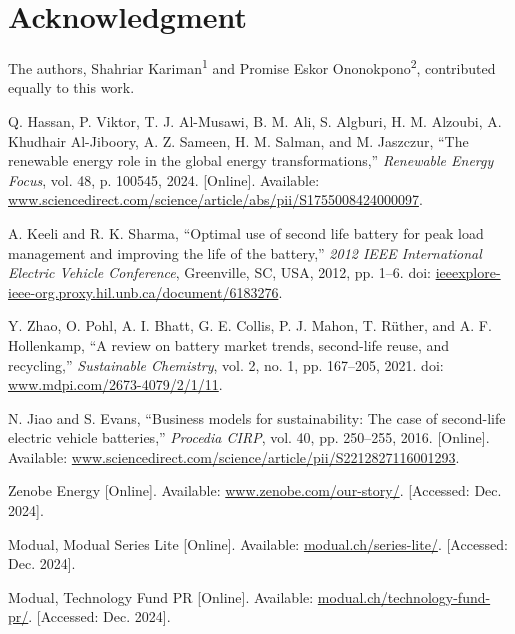 \documentclass[conference]{IEEEtran}
\begin{document}
\section*{Acknowledgment}

The authors, Shahriar Kariman\textsuperscript{1} and Promise Eskor Ononokpono\textsuperscript{2}, contributed equally to this work.

\begin{thebibliography}{00}
 Q. Hassan, P. Viktor, T. J. Al-Musawi, B. M. Ali, S. Algburi, H. M. Alzoubi, A. Khudhair Al-Jiboory, A. Z. Sameen, H. M. Salman, and M. Jaszczur, ``The renewable energy role in the global energy transformations,'' \textit{Renewable Energy Focus}, vol. 48, p. 100545, 2024. [Online]. Available: \href{https://www.sciencedirect.com/science/article/abs/pii/S1755008424000097?casa_token=bUNZr0M6nogAAAAA:BW6rOq1yhF3iUOtobThX-tDWVjZDpJL9Hzmk0HS78usaDj24Zq_MftqZLBkgYpIrtdgdilaX}{www.sciencedirect.com/science/article/abs/pii/S1755008424000097}.

 A. Keeli and R. K. Sharma, ``Optimal use of second life battery for peak load management and improving the life of the battery,''  \textit{2012 IEEE International Electric Vehicle Conference}, Greenville, SC, USA, 2012, pp. 1--6. doi: \href{https://ieeexplore-ieee-org.proxy.hil.unb.ca/document/6183276}{ieeexplore-ieee-org.proxy.hil.unb.ca/document/6183276}.


 Y. Zhao, O. Pohl, A. I. Bhatt, G. E. Collis, P. J. Mahon, T. Rüther, and A. F. Hollenkamp, ``A review on battery market trends, second-life reuse, and recycling,'' \textit{Sustainable Chemistry}, vol. 2, no. 1, pp. 167--205, 2021. doi: \href{https://www.mdpi.com/2673-4079/2/1/11}{www.mdpi.com/2673-4079/2/1/11}.

 N. Jiao and S. Evans, ``Business models for sustainability: The case of second-life electric vehicle batteries,'' \textit{Procedia CIRP}, vol. 40, pp. 250--255, 2016. [Online]. Available: \href{https://www.sciencedirect.com/science/article/pii/S2212827116001293}{www.sciencedirect.com/science/article/pii/S2212827116001293}.

 Zenobe Energy [Online]. Available: \href{https://www.zenobe.com/our-story/}{www.zenobe.com/our-story/}. [Accessed: Dec. 2024].

 Modual, Modual Series Lite [Online]. Available: \href{https://modual.ch/series-lite/}{modual.ch/series-lite/}. [Accessed: Dec. 2024].

 Modual, Technology Fund PR [Online]. Available: \href{https://modual.ch/technology-fund-pr/}{modual.ch/technology-fund-pr/}. [Accessed: Dec. 2024].


\end{thebibliography}
\end{document}
